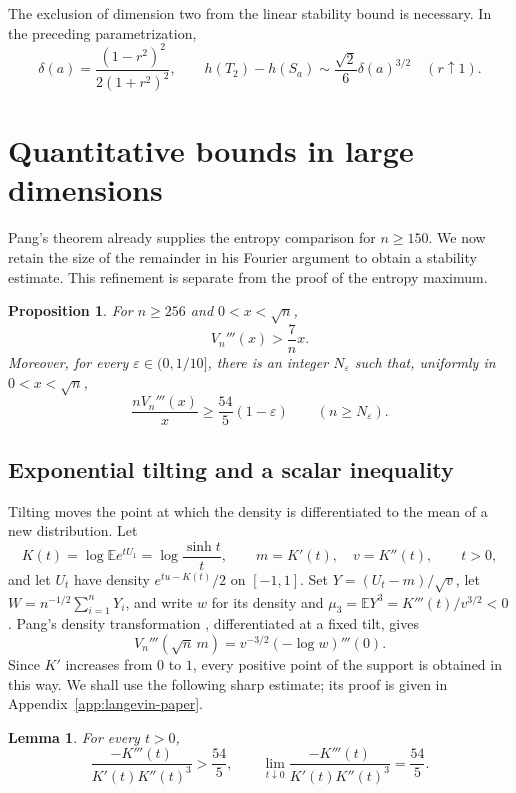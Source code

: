 \documentclass[11pt,a4paper]{article}
\newtheorem{proposition}[theorem]{Proposition}
\newtheorem{lemma}[theorem]{Lemma}
\theoremstyle{remark}\newtheorem{remark}[theorem]{Remark}
\newcommand{\E}{\mathbb E}
\begin{document}
The exclusion of dimension two from the linear stability bound is
necessary. In the preceding parametrization,
\[
 \delta(a)=\frac{(1-r^2)^2}{2(1+r^2)^2},\qquad
 h(T_2)-h(S_a)\sim\frac{\sqrt2}{6}\delta(a)^{3/2}
 \quad(r\uparrow1).
\]

\section{Quantitative bounds in large dimensions}\label{sec:large}
Pang's theorem already supplies the entropy comparison for $n\ge150$.
We now retain the size of the remainder in his Fourier argument to obtain
a stability estimate. This refinement is separate from the proof of the
entropy maximum.

\begin{proposition}\label{prop:large-curvature}
For $n\ge256$ and $0<x<\sqrt n$,
\[
 V_n'''(x)>\frac7n x.
\]
Moreover, for every $\varepsilon\in(0,1/10]$, there is an integer
$N_\varepsilon$ such that, uniformly in $0<x<\sqrt n$,
\[
 \frac{nV_n'''(x)}x\ge\frac{54}{5}(1-\varepsilon)
 \qquad(n\ge N_\varepsilon).
\]
\end{proposition}

\subsection{Exponential tilting and a scalar inequality}
Tilting moves the point at which the density is differentiated to the
mean of a new distribution. Let
\[
 K(t)=\log\E e^{tU_1}=\log\frac{\sinh t}{t},\qquad
 m=K'(t),\quad v=K''(t),\qquad t>0,
\]
and let $U_t$ have density $e^{tu-K(t)}/2$ on $[-1,1]$.
Set $Y=(U_t-m)/\sqrt v$, let $W=n^{-1/2}\sum_{i=1}^nY_i$, and write
$w$ for its density and $\mu_3=\E Y^3=K'''(t)/v^{3/2}<0$.
Pang's density transformation \cite[Section~3]{Pang}, differentiated at a
fixed tilt, gives
\begin{equation}\label{eq:large-tilt}
 V_n'''(\sqrt n\,m)=v^{-3/2}(-\log w)'''(0).
\end{equation}
Since $K'$ increases from $0$ to $1$, every positive point of the support
is obtained in this way. We shall use the following sharp estimate; its
proof is given in Appendix~\ref{app:langevin-paper}.

\begin{lemma}\label{lem:langevin-paper}
For every $t>0$,
\[
 \frac{-K'''(t)}{K'(t)K''(t)^3}>\frac{54}{5},
 \qquad
 \lim_{t\downarrow0}\frac{-K'''(t)}{K'(t)K''(t)^3}=\frac{54}{5}.
\]
\end{lemma}
\end{document}
